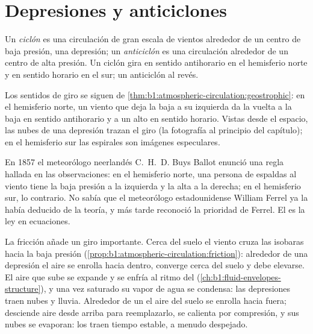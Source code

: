 \section{Depresiones y anticiclones}\label{sec:b1:atmospheric-circulation:cyclones}

\begin{definition}\label{def:b1:atmospheric-circulation:cyclone}
Un \emph{ciclón} es una circulación de gran escala de vientos alrededor de un centro de baja presión, una depresión; un \emph{anticiclón} es una circulación alrededor de un centro de alta presión. Un ciclón gira en sentido antihorario en el hemisferio norte y en sentido horario en el sur; un anticiclón al revés.
\end{definition}

Los sentidos de giro se siguen de \cref{thm:b1:atmospheric-circulation:geostrophic}: en el hemisferio norte, un viento que deja la baja a su izquierda da la vuelta a la baja en sentido antihorario y a un alto en sentido horario. Vistas desde el espacio, las nubes de una depresión trazan el giro (la fotografía al principio del capítulo); en el hemisferio sur las espirales son imágenes especulares.

\begin{history}
En 1857 el meteorólogo neerlandés C.~H.~D. Buys Ballot enunció una regla hallada en las observaciones: en el hemisferio norte, una persona de espaldas al viento tiene la baja presión a la izquierda y la alta a la derecha; en el hemisferio sur, lo contrario. No sabía que el meteorólogo estadounidense William Ferrel ya la había deducido de la teoría, y más tarde reconoció la prioridad de Ferrel.
El  es la ley en ecuaciones.
\end{history}

La fricción añade un giro importante. Cerca del suelo el viento cruza las isobaras hacia la baja presión (\cref{prop:b1:atmospheric-circulation:friction}): alrededor de una depresión el aire se enrolla hacia dentro, converge cerca del suelo y debe elevarse. El aire que sube se expande y se enfría al ritmo del  (\cref{ch:b1:fluid-envelopes-structure}), y una vez saturado su vapor de agua se condensa: las depresiones traen nubes y lluvia. Alrededor de un  el aire del suelo se enrolla hacia fuera; desciende aire desde arriba para reemplazarlo, se calienta por compresión, y sus nubes se evaporan: los  traen tiempo estable, a menudo despejado.

